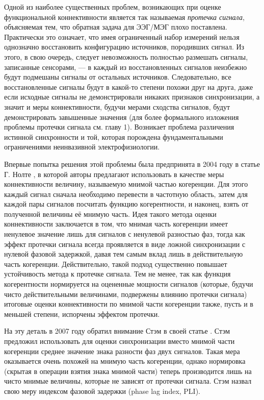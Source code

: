 Одной из наиболее существенных проблем, возникающих при оценке функциональной коннективности является
так называемая \emph{протечка сигнала}, объясняемая тем, что обратная задача для ЭЭГ/МЭГ
плохо поставлена. Практически это означает, что имея ограниченный набор измерений нельзя однозначно восстановить
конфигурацию источников, породивших сигнал. Из этого, в свою очередь, следует невозможность полностью
размешать сигналы, записанные сенсорами, --- в каждый из восстановленных сигналов неизбежно будут
подмешаны сигналы от остальных источников. Следовательно, все восстановленные сигналы будут в какой-то
степени похожи друг на друга, даже если исходные сигналы не демонстрировали никаких признаков синхронизации, а значит и
меры коннективности, будучи мерами сходства сигналов, будут демонстрировать завышенные значения
(для более формального изложения проблемы протечки сигнала см. главу 1). Возникает проблема различения истинной синхронности
и той, которая порождена фундаментальными ограничениями неинвазивной электрофизиологии.

Впервые попытка решения этой проблемы была предпринята в 2004 году в статье Г. Нолте
,
в которой авторы предлагают использовать в качестве меры коннективности величину, называемую мнимой частью когеренции.
Для этого каждый сигнал сначала необходимо перевести в частотную область,
затем для каждой пары сигналов посчитать функцию когерентности, и наконец, взять от полученной величины её мнимую часть.
Идея такого метода оценки коннективности заключается в том, что мнимая часть когеренции имеет ненулевое значение лишь
для сигналов с ненулевой разностью фаз, тогда как эффект протечки сигнала всегда проявляется в виде ложной синхронизации
с нулевой фазовой задержкой, давая тем самым вклад лишь в действительную часть когеренции. Действительно, такой подход
существенно повышает устойчивость метода к протечке сигнала. Тем не менее, так как функция когерентности
нормируется на оцененные мощности сигналов (которые, будучи чисто действительными величинами, подвержены влиянию
протечки сигнала) итоговые оценки коннективности по мнимой части когеренции также, пусть и в меньшей степени,
испорчены эффектом протечки.

На эту деталь в 2007 году обратил внимание Стэм в своей статье
. Стэм предложил использовать для оценки синхронизации
вместо мнимой части когеренции среднее значение знака разности фаз двух сигналов.
Такая мера оказывается очень похожей на мнимую часть когеренции, однако нормировка
(скрытая в операции взятия знака мнимой части) теперь производится лишь на чисто мнимые величины, которые не
зависят от протечки сигнала. Стэм назвал свою меру индексом фазовой задержки (phase lag index, PLI).

